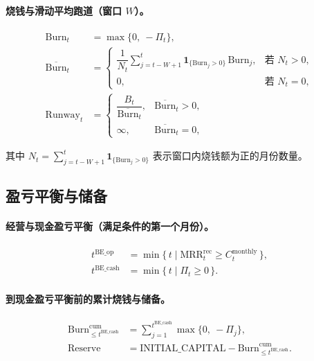 \documentclass[11pt, a4paper, oneside]{article}
\begin{document}
\paragraph{烧钱与滑动平均跑道（窗口 $W$）。}
\begin{align}
\mathrm{Burn}_t &= \max\{0,\ -\Pi_t\},\\
\overline{\mathrm{Burn}}_t 
  &= 
  \begin{cases}
    \dfrac{1}{N_t} \sum_{j=t-W+1}^{t} \mathbf{1}_{\{\mathrm{Burn}_j>0\}}\, \mathrm{Burn}_j, & \text{若 } N_t>0,\\[6pt]
    0, & \text{若 } N_t=0,
  \end{cases}\\
\mathrm{Runway}_t 
  &= 
  \begin{cases}
    \dfrac{B_t}{\overline{\mathrm{Burn}}_t}, & \overline{\mathrm{Burn}}_t > 0,\\[6pt]
    \infty, & \overline{\mathrm{Burn}}_t = 0,
  \end{cases}
\end{align}



其中 $N_t=\sum_{j=t-W+1}^{t}\mathbf{1}_{\{\mathrm{Burn}_j>0\}}$ 表示窗口内烧钱额为正的月份数量。

\subsection{盈亏平衡与储备}
\paragraph{经营与现金盈亏平衡（满足条件的第一个月份）。}
\begin{align}
t^{\mathrm{BE\_op}} 
  &= \min\{\, t \mid \mathrm{MRR}^{\mathrm{rec}}_t \ge C^{\mathrm{monthly}}_t \,\},\\
t^{\mathrm{BE\_cash}} 
  &= \min\{\, t \mid \Pi_t \ge 0 \,\}.
\end{align}

\paragraph{到现金盈亏平衡前的累计烧钱与储备。}
\begin{align}
\mathrm{Burn}^{\mathrm{cum}}_{\le t^{\mathrm{BE\_cash}}} 
  &= \sum_{j=1}^{t^{\mathrm{BE\_cash}}} \max\{0,\ -\Pi_j\},\\
\mathrm{Reserve}
  &= \text{INITIAL\_CAPITAL} - \mathrm{Burn}^{\mathrm{cum}}_{\le t^{\mathrm{BE\_cash}}}.
\end{align}
\end{document}
